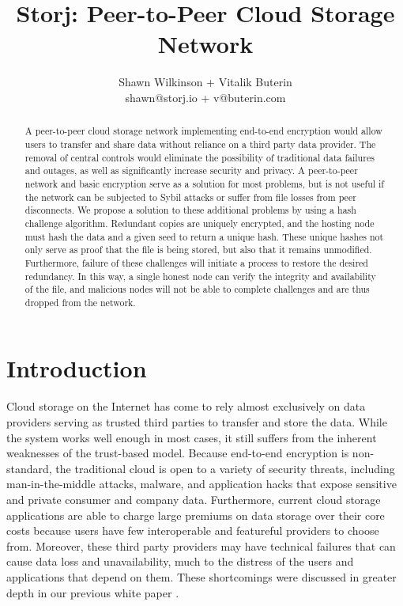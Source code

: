 \documentclass[a4paper,10pt]{article}
\begin{document}
\lstset{basicstyle=\ttfamily\footnotesize,breaklines=true}
\lstset{numbers=left, numberstyle=\tiny, stepnumber=1, numbersep=5pt}
\lstset{language=TeX}


\title{\large \bf Storj:  Peer-to-Peer Cloud Storage Network}
\author{\small Shawn Wilkinson + Vitalik Buterin\\ \small shawn@storj.io + v@buterin.com \\ }
\maketitle
\begin{abstract}
A peer-to-peer cloud storage network implementing end-to-end encryption would allow users to transfer and share data without reliance on a third party data provider. The removal of central controls would eliminate the possibility of traditional data failures and outages, as well as significantly increase security and privacy. A peer-to-peer network and basic encryption serve as a solution for most problems, but is not useful if the network can be subjected to Sybil attacks or suffer from file losses from peer disconnects. We propose a solution to these additional problems by using a hash challenge algorithm. Redundant copies are uniquely encrypted, and the hosting node must hash the data and a given seed to return a unique hash. These unique hashes not only serve as proof that the file is being stored, but also that it remains unmodified. Furthermore, failure of these challenges will initiate a process to restore the desired redundancy. In this way, a single honest node can verify the integrity and availability of the file, and malicious nodes will not be able to complete challenges and are thus dropped from the network. 
\end{abstract}

\section{Introduction}
Cloud storage on the Internet has come to rely almost exclusively on data providers serving as trusted third parties to transfer and store the data. While the system works well enough in most cases, it still suffers from the inherent weaknesses of the trust-based model. Because end-to-end encryption is non-standard, the traditional cloud is open to a variety of security threats, including man-in-the-middle attacks, malware, and application hacks that expose sensitive and private consumer and company data. Furthermore, current cloud storage applications are able to charge large premiums on data storage over their core costs because users have few interoperable and featureful providers to choose from. Moreover, these third party providers may have technical failures that can cause data loss and unavailability, much to the distress of the users and applications that depend on them. These shortcomings were discussed in greater depth in our previous white paper \cite{1}.\\
\end{document}
